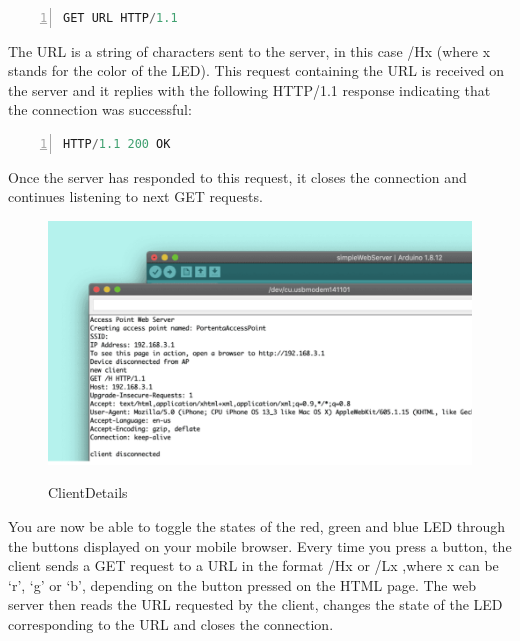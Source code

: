\begin{itemize}
	\begin{lstlisting}[language=C++, frame=single, numbers=left, basicstyle=\ttfamily\small]
		GET URL HTTP/1.1
	\end{lstlisting}
	
	The URL is a string of characters sent to the server, in this case /Hx (where x stands for the color of the LED). This request containing the URL is received on the server and it replies with the following HTTP/1.1 response indicating that the connection was successful:
	
	\begin{lstlisting}[language=C++, frame=single, numbers=left, basicstyle=\ttfamily\small]
		HTTP/1.1 200 OK
	\end{lstlisting}
	
	Once the server has responded to this request, it closes the connection and continues listening to next GET requests.
	
	\begin{figure}
		\begin{center}
			\includegraphics[width=0.7\linewidth]{Images/WIFI Module/ClientDetails.png}
			\caption{ClientDetails}
			\label{ClientDetails} \cite{portentaWifiAccessPoint:2024}
		\end{center}
	\end{figure}
	
	You are now be able to toggle the states of the red, green and blue LED through the buttons displayed on your mobile browser. Every time you press a button, the client sends a GET request to a URL in the format /Hx or /Lx ,where x can be ‘r’, ‘g’ or ‘b’, depending on the button pressed on the HTML page. The web server then reads the URL requested by the client, changes the state of the LED corresponding to the URL and closes the connection. \cite{portentaWifiAccessPoint:2024}
	

\end{itemize}
